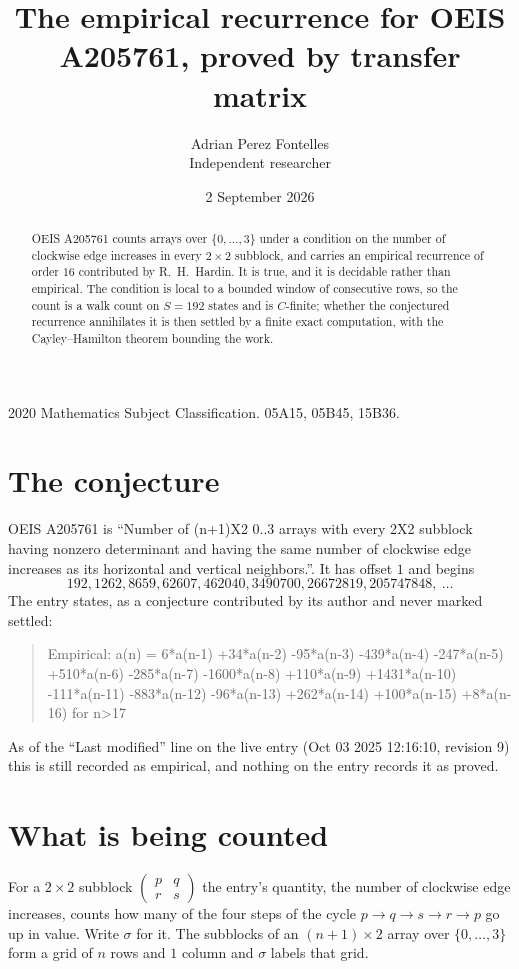 \documentclass[11pt,a4paper]{article}
\title{The empirical recurrence for OEIS A205761, proved by transfer matrix}
\author{Adrian Perez Fontelles\\ \small Independent researcher}
\date{2 September 2026}
\theoremstyle{plain}
\theoremstyle{definition}
\begin{document}
\maketitle

\begin{abstract}
OEIS A205761 counts arrays over $\{0,\dots,3\}$ under a condition on the number of clockwise edge increases
in every $2\times2$ subblock, and carries an empirical recurrence of order $16$ contributed by
R.~H.~Hardin. It is true, and it is decidable rather than empirical. The condition is local to
a bounded window of consecutive rows, so the count is a walk count on $S=192$ states and is
$C$-finite; whether the conjectured recurrence annihilates it is then settled by a finite exact
computation, with the Cayley--Hamilton theorem bounding the work.
\end{abstract}

\noindent\small 2020 Mathematics Subject Classification. 05A15, 05B45, 15B36.\normalsize

\section{The conjecture}

OEIS A205761 is ``Number of (n+1)X2 0..3 arrays with every 2X2 subblock having nonzero determinant and having the same number of clockwise edge increases as its horizontal and vertical neighbors.''. It has offset $1$ and begins
\[
192, 1262, 8659, 62607, 462040, 3490700, 26672819, 205747848,\ \dots
\]
The entry states, as a conjecture contributed by its author and never marked settled:
\begin{quote}
Empirical: a(n) = 6*a(n-1) +34*a(n-2) -95*a(n-3) -439*a(n-4) -247*a(n-5) +510*a(n-6) -285*a(n-7) -1600*a(n-8) +110*a(n-9) +1431*a(n-10) -111*a(n-11) -883*a(n-12) -96*a(n-13) +262*a(n-14) +100*a(n-15) +8*a(n-16) for n>17
\end{quote}
As of the ``Last modified'' line on the live entry (Oct 03 2025 12:16:10, revision 9) this is still
recorded as empirical, and nothing on the entry records it as proved.

\section{What is being counted}

For a $2\times2$ subblock $\begin{pmatrix}p&q\\r&s\end{pmatrix}$ the
entry's quantity, the number of clockwise edge increases, counts how many of the four steps of the cycle $p\to q\to s\to r\to p$ go up in value. Write $\sigma$ for it. The subblocks of an
$(n+1)\times2$ array over $\{0,\dots,3\}$ form a grid of $n$ rows and $1$
column and $\sigma$ labels that grid.
\end{document}
